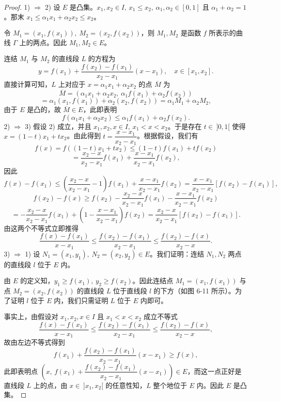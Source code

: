 \begin{proof}

	1) \(\Longrightarrow\) 2) 设 \(E\) 是凸集。\(x_1,x_2\in I,\ x_1\le x_2,\ \alpha_1,\alpha_2\in[0,1]\) 且 \(\alpha_1+\alpha_2=1\)。那末 \(x_1\le\alpha_1x_1+\alpha_2x_2\le x_2\)。

	令 \(M_1=(x_1,f(x_1)),\ M_2=(x_2,f(x_2))\)，则 \(M_1,M_2\) 是函数 \(f\) 所表示的曲线 \(\Gamma\) 上的两点。因此 \(M_1,M_2\in E\)。

	连结 \(M_1\) 与 \(M_2\) 的直线段 \(L\) 的方程为
	\[
	y=f(x_1)+\frac{f(x_2)-f(x_1)}{x_2-x_1}(x-x_1),\quad x\in[x_1,x_2].
	\]
	直接计算可知，\(L\) 上对应于 \(x=\alpha_1x_1+\alpha_2x_2\) 的点 \(\overline M\) 为
	\[
	\overline M=(\alpha_1x_1+\alpha_2x_2,\ \alpha_1f(x_1)+\alpha_2f(x_2))
	\]
	\[
	=\alpha_1(x_1,f(x_1))+\alpha_2(x_2,f(x_2))=\alpha_1M_1+\alpha_2M_2,
	\]
	由于 \(E\) 是凸的，故 \(\overline M\in E\)，此即表明
	\[
	f(\alpha_1x_1+\alpha_2x_2)\le\alpha_1f(x_1)+\alpha_2f(x_2).
	\]
	2) \(\Longrightarrow\) 3) 假设 2) 成立，并且 \(x_1,x_2,x\in I,\ x_1<x<x_2\)。于是存在 \(t\in\ ]0,1[\) 使得 \(x=(1-t)x_1+tx_2\)。由此得到 \(t=\dfrac{x-x_1}{x_2-x_1}\)。根据假设，我们有
	\[
	f(x)=f((1-t)x_1+tx_2)\le(1-t)f(x_1)+tf(x_2)
	\]
	\[
	=\frac{x_2-x}{x_2-x_1}f(x_1)+\frac{x-x_1}{x_2-x_1}f(x_2),
	\]
	因此
	\[
	f(x)-f(x_1)\le\left(\frac{x_2-x}{x_2-x_1}-1\right)f(x_1)+\frac{x-x_1}{x_2-x_1}f(x_2)=\frac{x-x_1}{x_2-x_1}[f(x_2)-f(x_1)],
	\]
	\[
	f(x_2)-f(x)\ge f(x_2)-\frac{x_2-x}{x_2-x_1}f(x_1)-\frac{x-x_1}{x_2-x_1}f(x_2)
	\]
	\[
	=-\frac{x_2-x}{x_2-x_1}f(x_1)+\left(1-\frac{x-x_1}{x_2-x_1}\right)f(x_2)=\frac{x_2-x}{x_2-x_1}[f(x_2)-f(x_1)].
	\]
	由这两个不等式立即推得
	\[
	\frac{f(x)-f(x_1)}{x-x_1}\le\frac{f(x_2)-f(x_1)}{x_2-x_1}\le\frac{f(x_2)-f(x)}{x_2-x}.
	\]
	3) \(\Longrightarrow\) 1) 设 \(N_1=(x_1,y_1),\ N_2=(x_2,y_2)\in E\)。我们证明：连结 \(N_1,N_2\) 两点的直线段 \(l\) 位于 \(E\) 内。

	由 \(E\) 的定义知，\(y_1\ge f(x_1),\ y_2\ge f(x_2)\)。因此连结点 \(M_1=(x_1,f(x_1))\) 与点 \(M_2=(x_2,f(x_2))\) 的直线段 \(L\) 位于直线段 \(l\) 的下方（如图 6-11 所示）。为了证明 \(l\) 位于 \(E\) 内，我们只需证明 \(L\) 位于 \(E\) 内即可。

	事实上，由假设对 \(x_1,x_2,x\in I\) 且 \(x_1<x<x_2\) 成立不等式
	\[
	\frac{f(x)-f(x_1)}{x-x_1}\le\frac{f(x_2)-f(x_1)}{x_2-x_1}\le\frac{f(x_2)-f(x)}{x_2-x},
	\]
	故由左边不等式得到
	\[
	f(x_1)+\frac{f(x_2)-f(x_1)}{x_2-x_1}(x-x_1)\ge f(x),
	\]
	此即表明点 \(\left(x,\ f(x_1)+\dfrac{f(x_2)-f(x_1)}{x_2-x_1}(x-x_1)\right)\in E\)，而这一点正好是直线段 \(L\) 上的点，由 \(x\in\ ]x_1,x_2[\) 的任意性知，\(L\) 整个地位于 \(E\) 内。因此 \(E\) 是凸集。

\end{proof}


